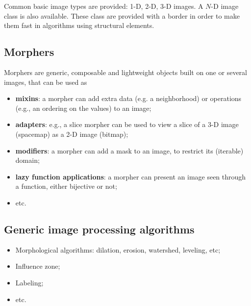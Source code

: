 \documentclass{article}
\begin{document}
Common basic image types are provided: 1-D, 2-D, 3-D images.
A $N$-D image class is also available.
These class are provided with a border in order to make them fast in algorithms
using structural elements.

\subsection{Morphers}

Morphers are generic, composable and lightweight objects built on one or several
images, that can be used as
\begin{itemize}
  \item \textbf{mixins}: a morpher can add extra data (e.g. a neighborhood) or
	operations (e.g., an ordering on the values) to an image;
  \item \textbf{adapters}: e.g., a slice morpher can be used to view a slice of
	a 3-D image (spacemap) as a 2-D image (bitmap);
  \item \textbf{modifiers}: a morpher can add a mask to an image, to restrict its
	(iterable) domain;
  \item \textbf{lazy function applications}: a morpher can present an image seen
        through a function, either bijective or not;
  \item etc.
\end{itemize}

\begin{center}
\end{center}

\subsection{Generic image processing algorithms}

\begin{itemize}
  \item Morphological algorithms: dilation, erosion, watershed, leveling, etc;
  \item Influence zone;
  \item Labeling;
  \item etc.
\end{itemize}

\end{document}
